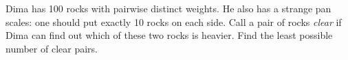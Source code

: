 Dima has 100 rocks with pairwise distinct weights. He also has a strange pan scales: one should put exactly 10 rocks on each side. Call a pair of rocks {\it clear} if Dima can find out which of these two rocks is heavier. Find the least possible number of clear pairs.